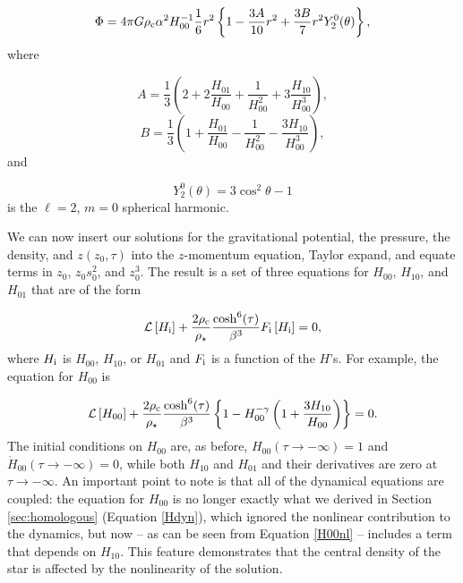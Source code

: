 \documentclass[twocolumn]{aastex62}
\begin{document}
\begin{equation}
\Phi = 4\pi G\rho_{\rm c}\alpha^2H_{00}^{-1}\frac{1}{6}r^2\left\{1-\frac{3A}{10}r^2+\frac{3B}{7}r^2Y^{0}_2(\theta)\right\}, \label{Phisol}
\end{equation}
where

\begin{equation}
A = \frac{1}{3}\left(2+2\frac{H_{01}}{H_{00}}+\frac{1}{H_{00}^2}+3\frac{H_{10}}{H_{00}^3}\right),
\end{equation}
\begin{equation}
B = \frac{1}{3}\left(1+\frac{H_{01}}{H_{00}}-\frac{1}{H_{00}^2}-\frac{3H_{10}}{H_{00}^3}\right),
\end{equation}
and

\begin{equation}
Y^{0}_{2}(\theta) = 3\cos^2\theta-1
\end{equation}
is the $\ell = 2$, $m = 0$ spherical harmonic. 

We can now insert our solutions for the gravitational potential, the pressure, the density, and $z(z_0,\tau)$ into the $z$-momentum equation, Taylor expand, and equate terms in $z_0$, $z_0s_0^2$, and $z_0^3$. The result is a set of three equations for $H_{00}$, $H_{10}$, and $H_{01}$ that are of the form

\begin{equation}
\mathcal{L}\left[H_{\rm i}\right]+\frac{2\rho_{\rm c}}{\rho_{\star}}\frac{\cosh^6(\tau)}{\beta^3}F_{\rm i}\left[H_{\rm i}\right]= 0, \label{H00nl}
\end{equation}
where $H_{\rm i}$ is $H_{00}$, $H_{10}$, or $H_{01}$ and $F_{\rm i}$ is a function of the $H$'s. For example, the equation for $H_{00}$ is

\begin{equation}
\mathcal{L}\left[H_{00}\right]+\frac{2\rho_{\rm c}}{\rho_{\star}}\frac{\cosh^6(\tau)}{\beta^3}\left\{1-H_{00}^{-\gamma}\left(1+\frac{3H_{10}}{H_{00}}\right)\right\} = 0.
\end{equation}
The initial conditions on $H_{00}$ are, as before, $H_{00}(\tau \rightarrow -\infty) = 1$ and $\dot{H}_{00}(\tau \rightarrow -\infty) = 0$, while both $H_{10}$ and $H_{01}$ and their derivatives are zero at $\tau \rightarrow -\infty$. An important point to note is that all of the dynamical equations are {coupled}: the equation for $H_{00}$ is no longer exactly what we derived in Section \ref{sec:homologous} (Equation \ref{Hdyn}), which ignored the nonlinear contribution to the dynamics, but now -- as can be seen from Equation \eqref{H00nl} -- includes a term that depends on $H_{10}$. This feature demonstrates that the central density of the star is affected by the nonlinearity of the solution.
\end{document}
